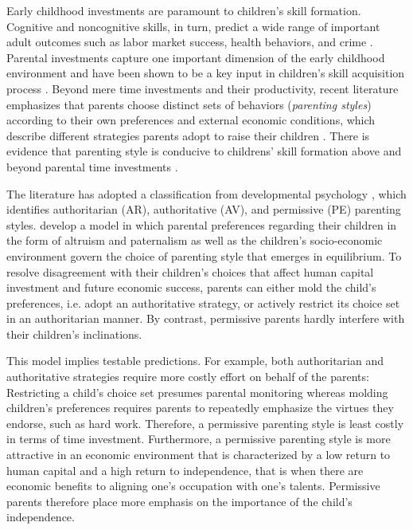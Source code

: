 Early childhood investments are paramount to children's skill formation. Cognitive and noncognitive skills, in turn, predict a wide range of important adult outcomes such as labor market success, health behaviors, and crime \parencites[e.g.][]{heckmanEffectsCognitiveNoncognitive2006}{almlundPersonalityPsychologyEconomics2011}. Parental investments capture one important dimension of the early childhood environment and have been shown to be a key input in children's skill acquisition process \parencites[e.g.][]{falkSocioEconomicStatusInequalities2021}{attanasioEstimatingProductionFunction2020}. Beyond mere time investments and their productivity, recent literature emphasizes that parents choose distinct sets of behaviors (\textit{parenting styles}) according to their own preferences and external economic conditions, which describe different strategies parents adopt to raise their children \parencites{doepkeParentingStyleAltruism2017}{doepkeEconomicsParenting2019}. There is evidence that parenting style is conducive to childrens' skill formation above and beyond parental time investments \parencite{cobb-clarkParentingStyleInvestment2019}.

The literature has adopted a classification from developmental psychology \parencite{baumrindChildCarePractices1967}, which identifies authoritarian (AR), authoritative (AV), and permissive (PE) parenting styles. \textcite{doepkeParentingStyleAltruism2017} develop a model in which parental preferences regarding their children in the form of altruism and paternalism as well as the children's socio-economic environment govern the choice of parenting style that emerges in equilibrium. To resolve disagreement with their children's choices that affect human capital investment and future economic success, parents can either mold the child's preferences, i.e. adopt an authoritative strategy, or actively restrict its choice set in an authoritarian manner. By contrast, permissive parents hardly interfere with their children's inclinations.

This model implies testable predictions. For example, both authoritarian and authoritative strategies require more costly effort on behalf of the parents: Restricting a child's choice set presumes parental monitoring whereas molding children's preferences requires parents to repeatedly emphasize the virtues they endorse, such as hard work. Therefore, a permissive parenting style is least costly in terms of time investment. Furthermore, a permissive parenting style is more attractive in an economic environment that is characterized by a low return to human capital and a high return to independence, that is when there are economic benefits to aligning one's occupation with one's talents. Permissive parents therefore place more emphasis on the importance of the child's independence. 


